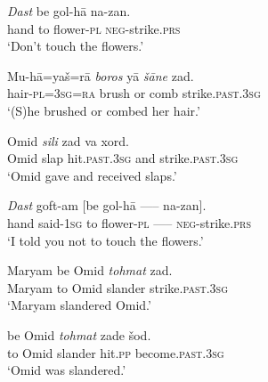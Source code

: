 \documentclass[output=paper]{langsci/langscibook}
\begin{document}
	
	\begin{exe}
		\ex \label{pers-neg}
		\gll \textit{Dast} be gol-h\=a na-zan.\\
		hand to flower-\textsc{pl}  \textsc{neg}-strike.\textsc{prs}\\
		\glt`Don't touch the flowers.'
	\end{exe}
	
	\begin{exe}
		\ex \label{pers-coord1}
		\gll Mu-h\=a=ya\v{s}=r\=a \textit{boros} y\=a \textit{\v{s}\=ane} zad.\\
		hair-\textsc{pl=3sg=ra} brush or comb strike.\textsc{past.3sg}\\
		\glt `(S)he brushed or combed her hair.'
	\end{exe}
	
	\begin{exe}
		\ex \label{pers-coord2}
		\gll Omid \textit{sili} zad va xord.\\
		Omid slap hit.\textsc{past.3sg} and strike.\textsc{past.3sg}\\
		\glt `Omid gave and received slaps.'
	\end{exe}
	
	\begin{exe}
		\ex \label{pers-top}
		\gll \textit{Dast} goft-am [be gol-h\=a -----  na-zan].\\
		hand said-\textsc{1sg} to flower-\textsc{pl} ----- \textsc{neg}-strike.\textsc{prs}\\
		\glt `I told you not to touch the flowers.'
	\end{exe}
	
	\begin{exe}
		\ex  \label{pers-pass}
		
		\begin{xlist} 
			
			\ex  \label{pers-pass-a}
			\gll Maryam be Omid \textit{tohmat} zad.\\
			Maryam to Omid slander strike.\textsc{past.3sg}\\
			\glt `Maryam slandered Omid.'
			
			\ex  \label{pers-pass-b}
			\gll be Omid \textit{tohmat} zade \v{s}od.\\
			to Omid slander hit.\textsc{pp} become.\textsc{past.3sg}\\
			\glt  `Omid was slandered.'
			
		\end{xlist}
	\end{exe}
	
\end{document}
